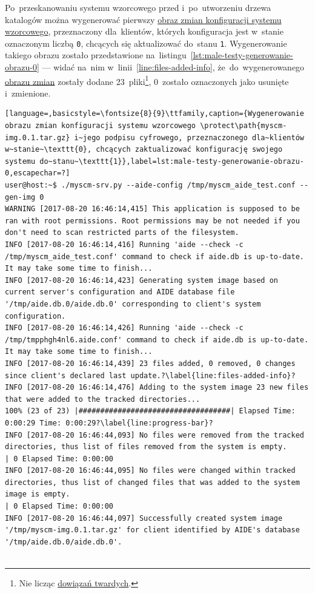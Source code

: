 \documentclass[thesis]{subfiles}
\begin{document}
Po~przeskanowaniu systemu wzorcowego przed i~po~utworzeniu drzewa katalogów  można wygenerować pierwszy \hyperref[sec:obraz-zmian-konfiguracji]{obraz zmian konfiguracji systemu wzorcowego}, przeznaczony dla~klientów, których konfiguracja jest w~stanie oznaczonym liczbą \texttt{0}, chcących się aktualizować do~stanu \texttt{1}. Wygenerowanie takiego obrazu zostało przedstawione na~listingu~\ref{lst:male-testy-generowanie-obrazu-0} --- widać na~nim w~linii~\ref{line:files-added-info}, że~do~wygenerowanego \hyperref[sec:obraz-zmian-konfiguracji]{obrazu zmian} zostały dodane 23~pliki\footnote{Nie licząc \href{https://en.wikipedia.org/wiki/Hard_link}{dowiązań twardych}.}, 0~zostało oznaczonych jako usunięte i~zmienione.

\begin{minipage}{\linewidth}
\begin{lstlisting}[language=,basicstyle=\fontsize{8}{9}\ttfamily,caption={Wygenerowanie obrazu zmian konfiguracji systemu wzorcowego \protect\path{myscm-img.0.1.tar.gz} i~jego podpisu cyfrowego, przeznaczonego dla~klientów w~stanie~\texttt{0}, chcących zaktualizować konfigurację swojego systemu do~stanu~\texttt{1}},label=lst:male-testy-generowanie-obrazu-0,escapechar=?]
user@host:~$ ./myscm-srv.py --aide-config /tmp/myscm_aide_test.conf --gen-img 0
WARNING [2017-08-20 16:46:14,415] This application is supposed to be ran with root permissions. Root permissions may be not needed if you don't need to scan restricted parts of the filesystem.
INFO [2017-08-20 16:46:14,416] Running 'aide --check -c /tmp/myscm_aide_test.conf' command to check if aide.db is up-to-date. It may take some time to finish...
INFO [2017-08-20 16:46:14,423] Generating system image based on current server's configuration and AIDE database file '/tmp/aide.db.0/aide.db.0' corresponding to client's system configuration.
INFO [2017-08-20 16:46:14,426] Running 'aide --check -c /tmp/tmpphgh4nl6.aide.conf' command to check if aide.db is up-to-date. It may take some time to finish...
INFO [2017-08-20 16:46:14,439] 23 files added, 0 removed, 0 changes since client's declared last update.?\label{line:files-added-info}?
INFO [2017-08-20 16:46:14,476] Adding to the system image 23 new files that were added to the tracked directories...
100% (23 of 23) |###################################| Elapsed Time: 0:00:29 Time: 0:00:29?\label{line:progress-bar}?
INFO [2017-08-20 16:46:44,093] No files were removed from the tracked directories, thus list of files removed from the system is empty.
| 0 Elapsed Time: 0:00:00
INFO [2017-08-20 16:46:44,095] No files were changed within tracked directories, thus list of changed files that was added to the system image is empty.
| 0 Elapsed Time: 0:00:00
INFO [2017-08-20 16:46:44,097] Successfully created system image '/tmp/myscm-img.0.1.tar.gz' for client identified by AIDE's database '/tmp/aide.db.0/aide.db.0'.


\end{lstlisting}
\end{minipage}
\end{document}
